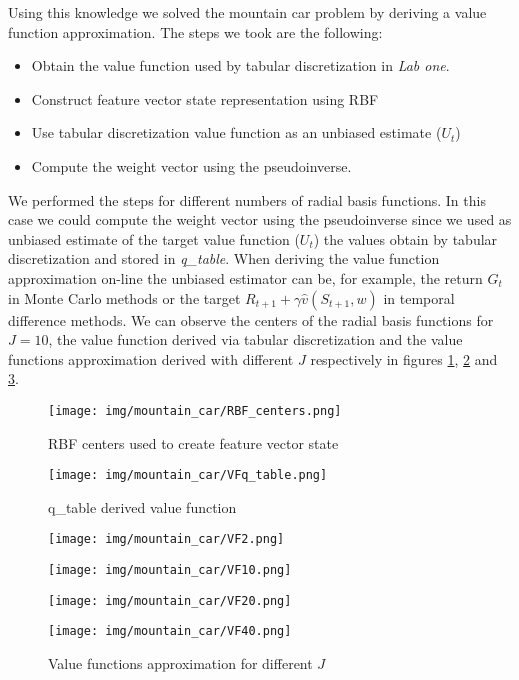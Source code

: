 \documentclass[runningheads]{llncs}
\begin{document}
Using this knowledge we solved the mountain car problem by
deriving a value function approximation. The steps we took are the
following:
\begin{itemize}
  \item Obtain the value function used by tabular discretization in
    \textit{Lab one}.
  \item Construct feature vector state representation using RBF
    \item Use tabular discretization value function as an unbiased
      estimate ($U_t$)
    \item Compute the weight vector using the pseudoinverse.
\end{itemize}
We performed the steps for different numbers of radial basis
functions. In this case we could compute the weight vector using the
pseudoinverse since we used as unbiased estimate of the target value
function ($U_t$) the values obtain by tabular discretization and
stored in \textit{q\_table}. When deriving the value function
approximation on-line the unbiased estimator can be, for
example, the return $G_t$ in Monte Carlo methods or the target
$R_{t+1} +\gamma\hat{v}(S_{t+1}, w)$ in temporal difference
methods. We can observe the centers of the radial basis functions for
$J = 10$, the value function derived via tabular discretization and
the value functions approximation derived with different $J$
respectively in figures \ref{fig4}, \ref{fig5} and \ref{fig6}.
\begin{figure}[!htb]
    \centering
\texttt{[image: img/mountain\_car/RBF\_centers.png]}
\caption{RBF centers used to create feature vector state}\label{fig4}
\end{figure}
\begin{figure}[!htb]
    \centering
\texttt{[image: img/mountain\_car/VFq\_table.png]}
\caption{q\_table derived value function}\label{fig5}
\end{figure}
\begin{figure}[!htb]
  \centering
  \begin{minipage}[b]{0.45\textwidth}
    \texttt{[image: img/mountain\_car/VF2.png]}
  \end{minipage}
  \hfill
  \begin{minipage}[b]{0.45\textwidth}
    \texttt{[image: img/mountain\_car/VF10.png]}
  \end{minipage}
    \hfill
  \begin{minipage}[b]{0.45\textwidth}
    \texttt{[image: img/mountain\_car/VF20.png]}
  \end{minipage}
    \hfill
  \begin{minipage}[b]{0.45\textwidth}
    \texttt{[image: img/mountain\_car/VF40.png]}
  \end{minipage}
 \caption{Value functions approximation for different $J$}\label{fig6}
\end{figure}
\end{document}
